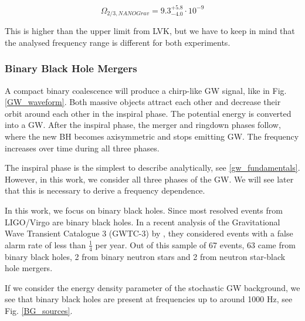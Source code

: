 \begin{equation}
    \Omega_{2/3, NANOGrav} = 9.3^{+5.8}_{-4.0}\cdot 10^{-9}
\end{equation}

This is higher than the upper limit from LVK, but we have to keep in mind that the analysed frequency range is different for both experiments.

\subsubsection{Binary Black Hole Mergers}
\label{BBH_mergers}

A compact binary coalescence will produce a chirp-like GW signal, like in Fig. \ref{GW_waveform}. Both massive objects attract each other and decrease their orbit around each other in the inspiral phase. The potential energy is converted into a GW. After the inspiral phase, the merger and ringdown phases follow, where the new BH becomes axisymmetric and stops emitting GW. The frequency increases over time during all three phases.

The inspiral phase is the simplest to describe analytically, see \ref{gw_fundamentals}. However, in this work, we consider all three phases of the GW. We will see later that this is necessary to derive a frequency dependence.


In this work, we focus on binary black holes. Since most resolved events from LIGO/Virgo are binary black holes. In a recent analysis of the Gravitational Wave Transient Catalogue 3 (GWTC-3) by \cite{the_ligo_scientific_collaboration_population_2022}, they considered events with a false alarm rate of less than $\frac{1}{4}$ per year. Out of this sample of 67 events, 63 came from binary black holes, 2 from binary neutron stars and 2 from neutron star-black hole mergers.

If we consider the energy density parameter of the stochastic GW background, we see that binary black holes are present at frequencies up to around 1000 Hz, see Fig. \ref{BG_sources}. 

